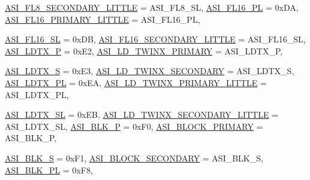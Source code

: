 \begin{DoxyCompactItemize}
\hyperlink{namespaceSparcISA_a6dd43f1311515252b283f56d7095a1f3ae0fea345f527e423390592969e7e92c7}{ASI\_\-FL8\_\-SECONDARY\_\-LITTLE} =  ASI\_\-FL8\_\-SL, 
\hyperlink{namespaceSparcISA_a6dd43f1311515252b283f56d7095a1f3ace440a7a17085ac994b38238870a2c78}{ASI\_\-FL16\_\-PL} =  0xDA, 
\hyperlink{namespaceSparcISA_a6dd43f1311515252b283f56d7095a1f3aabd73b3be9360723f2efdfa0e9d56225}{ASI\_\-FL16\_\-PRIMARY\_\-LITTLE} =  ASI\_\-FL16\_\-PL, 
\par
\hyperlink{namespaceSparcISA_a6dd43f1311515252b283f56d7095a1f3a07d6c71849fe3951cf142991030c5371}{ASI\_\-FL16\_\-SL} =  0xDB, 
\hyperlink{namespaceSparcISA_a6dd43f1311515252b283f56d7095a1f3a42b75acf3e9bc6a526e4ed6bfdf62385}{ASI\_\-FL16\_\-SECONDARY\_\-LITTLE} =  ASI\_\-FL16\_\-SL, 
\hyperlink{namespaceSparcISA_a6dd43f1311515252b283f56d7095a1f3af32971d8c277ea0154f95f5f543e971d}{ASI\_\-LDTX\_\-P} =  0xE2, 
\hyperlink{namespaceSparcISA_a6dd43f1311515252b283f56d7095a1f3a4bc0b35a923458ccc33d3debfa3df01d}{ASI\_\-LD\_\-TWINX\_\-PRIMARY} =  ASI\_\-LDTX\_\-P, 
\par
\hyperlink{namespaceSparcISA_a6dd43f1311515252b283f56d7095a1f3ad182422bf961efee4822d0239b7d2820}{ASI\_\-LDTX\_\-S} =  0xE3, 
\hyperlink{namespaceSparcISA_a6dd43f1311515252b283f56d7095a1f3ad70c65869baf607a333804b8d2ea10c4}{ASI\_\-LD\_\-TWINX\_\-SECONDARY} =  ASI\_\-LDTX\_\-S, 
\hyperlink{namespaceSparcISA_a6dd43f1311515252b283f56d7095a1f3aaa9022e150bbc8ad065a2b424b02053e}{ASI\_\-LDTX\_\-PL} =  0xEA, 
\hyperlink{namespaceSparcISA_a6dd43f1311515252b283f56d7095a1f3a3c6c8347ccae2d4c8e319a956ac5d8f8}{ASI\_\-LD\_\-TWINX\_\-PRIMARY\_\-LITTLE} =  ASI\_\-LDTX\_\-PL, 
\par
\hyperlink{namespaceSparcISA_a6dd43f1311515252b283f56d7095a1f3a041aa429ae2cfdf6ee0a1fd3493ad7a1}{ASI\_\-LDTX\_\-SL} =  0xEB, 
\hyperlink{namespaceSparcISA_a6dd43f1311515252b283f56d7095a1f3a0697a908e2df7fa518c83bac867e1b9f}{ASI\_\-LD\_\-TWINX\_\-SECONDARY\_\-LITTLE} =  ASI\_\-LDTX\_\-SL, 
\hyperlink{namespaceSparcISA_a6dd43f1311515252b283f56d7095a1f3a65c713483f85bea1ebffb2429260e493}{ASI\_\-BLK\_\-P} =  0xF0, 
\hyperlink{namespaceSparcISA_a6dd43f1311515252b283f56d7095a1f3a9e9b29b9732a677aca36f62fc4bd2e6c}{ASI\_\-BLOCK\_\-PRIMARY} =  ASI\_\-BLK\_\-P, 
\par
\hyperlink{namespaceSparcISA_a6dd43f1311515252b283f56d7095a1f3ac3c61d1c24ae825de82f318d638d50a4}{ASI\_\-BLK\_\-S} =  0xF1, 
\hyperlink{namespaceSparcISA_a6dd43f1311515252b283f56d7095a1f3a2c7dd53349a64f4d9eb584cf25aae841}{ASI\_\-BLOCK\_\-SECONDARY} =  ASI\_\-BLK\_\-S, 
\hyperlink{namespaceSparcISA_a6dd43f1311515252b283f56d7095a1f3a0ca8cc821a278e618167565794df8734}{ASI\_\-BLK\_\-PL} =  0xF8, 

\end{DoxyCompactItemize}
